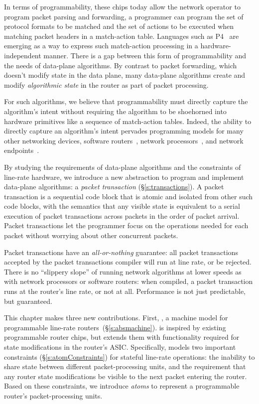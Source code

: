 In terms of programmability, these chips today allow the network operator to
program packet parsing and forwarding, \ie a programmer can program the set of
protocol formats to be matched and the set of actions to be executed when
matching packet headers in a match-action table. Languages such as P4~\cite{p4}
are emerging as a way to express such match-action processing in a
hardware-independent manner. There is a gap between this form of
programmability and the needs of data-plane algorithms. By contrast to packet
forwarding, which doesn't modify state in the data plane, many data-plane
algorithms create and modify {\em algorithmic state} in the router as part of
packet processing.

For such algorithms, we believe that programmability must directly capture the
algorithm's intent without requiring the algorithm to be shoehorned into
hardware primitives like a sequence of match-action tables. Indeed, the ability
to directly capture an algorithm's intent pervades programming models for many
other networking devices, \eg software routers~\cite{click}, network
processors~\cite{packetc}, and network endpoints~\cite{qdisc}.

By studying the requirements of data-plane algorithms and the constraints of
line-rate hardware, we introduce a new abstraction to program and implement
data-plane algorithms: a {\em packet transaction} (\S\ref{s:transactions}). A
packet transaction is a sequential code block that is atomic and isolated from
other such code blocks, with the semantics that any visible state is equivalent
to a serial execution of packet transactions across packets in the order of
packet arrival.  Packet transactions let the programmer focus on the operations
needed for each packet without worrying about other concurrent packets.

Packet transactions have an \textit{all-or-nothing} guarantee: all packet
transactions accepted by the packet transactions compiler will run at line
rate, or be rejected.  There is no ``slippery slope'' of running network
algorithms at lower speeds as with network processors or software routers: when
compiled, a packet transaction runs at the router's line rate, or not at all.
Performance is not just predictable, but guaranteed.

This chapter makes three new contributions.  First, {\em \absmachine}, a
machine model for programmable line-rate routers~(\S\ref{s:absmachine}).
\absmachine is inspired by existing programmable router chips, but extends them
with functionality required for state modifications in the router's ASIC.
Specifically, \absmachine models two important constraints
(\S\ref{s:atomConstraints}) for stateful line-rate operations: the inability to
share state between different packet-processing units, and the requirement that
any router state modifications be visible to the next packet entering the
router. Based on these constraints, we introduce {\em atoms} to represent a
programmable router's packet-processing units.

